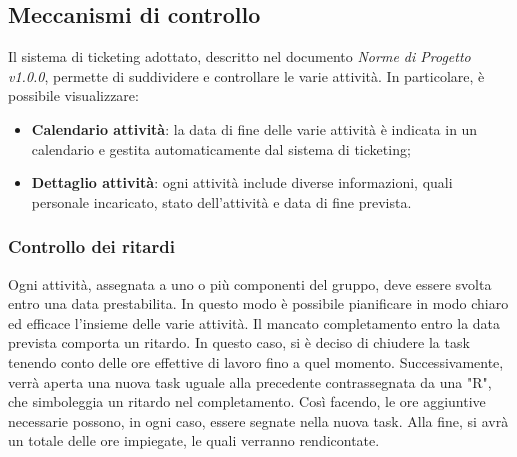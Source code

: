 \subsection{Meccanismi di controllo}
Il sistema di ticketing adottato, descritto nel documento \emph{Norme di Progetto v1.0.0}, permette di suddividere e controllare le varie attività. In particolare, è possibile visualizzare:
\begin{itemize}
\item{\textbf{Calendario attività}}: la data di fine delle varie attività è indicata in un calendario e gestita automaticamente dal sistema di ticketing;  
\item{\textbf{Dettaglio attività}}: ogni attività include diverse informazioni, quali personale incaricato, stato dell'attività e data di fine prevista. 
\end{itemize}
\subsubsection{Controllo dei ritardi}
Ogni attività, assegnata a uno o più componenti del gruppo, deve essere svolta entro una data prestabilita. In questo modo è possibile pianificare in modo chiaro ed efficace l'insieme delle varie attività. Il mancato completamento entro la data prevista comporta un ritardo. In questo caso, si è deciso di chiudere la task tenendo conto delle ore effettive di lavoro fino a quel momento. Successivamente, verrà aperta una nuova task uguale alla precedente contrassegnata da una "R", che simboleggia un ritardo nel completamento. Così facendo, le ore aggiuntive necessarie possono, in ogni caso, essere segnate nella nuova task. Alla fine, si avrà un totale delle ore impiegate, le quali verranno rendicontate.

